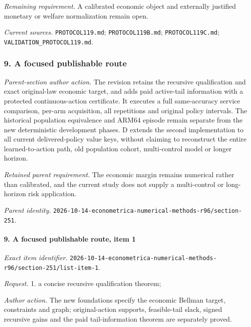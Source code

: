 \par\emph{Remaining requirement.} A calibrated economic object and externally justified monetary or welfare normalization remain open.

\par\emph{Current sources.} \nolinkurl{PROTOCOL119.md}; \nolinkurl{PROTOCOL119B.md}; \nolinkurl{PROTOCOL119C.md}; \nolinkurl{VALIDATION_PROTOCOL119.md}.

\subsubsection{9. A focused publishable route}

\emph{Parent-section author action.} The revision retains the recursive qualification and exact original-law economic target, and adds paid active-tail information with a protected continuous-action certificate. It executes a full same-accuracy service comparison, per-arm acquisition, all repetitions and original policy intervals. The historical population equivalence and ARM64 episode remain separate from the new deterministic development phases. D extends the second implementation to all current delivered-policy value keys, without claiming to reconstruct the entire learned-to-action path, old population cohort, multi-control model or longer horizon.

\par\emph{Retained parent requirement.} The economic margin remains numerical rather than calibrated, and the current study does not supply a multi-control or long-horizon risk application.

\par\emph{Parent identity.} \nolinkurl{2026-10-14-econometrica-numerical-methods-r96/section-251}.

\paragraph{9. A focused publishable route, item 1}

\emph{Exact item identifier.} \nolinkurl{2026-10-14-econometrica-numerical-methods-r96/section-251/list-item-1}.

\par\emph{Request.} 1. a concise recursive qualification theorem;

\par\emph{Author action.} The new foundations specify the economic Bellman target, constraints and graph; original-action supports, feasible-tail slack, signed recursive gains and the paid tail-information theorem are separately proved.

